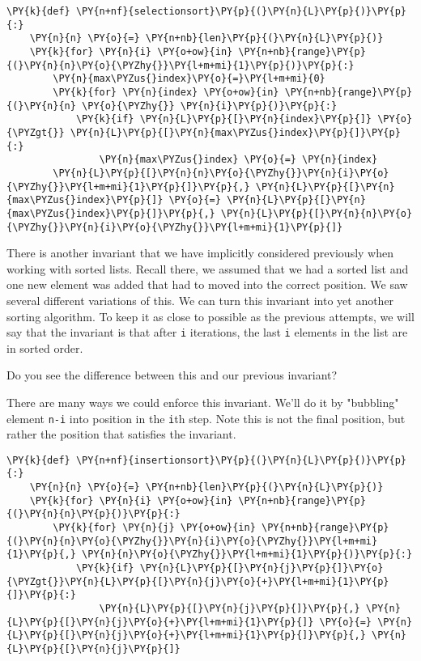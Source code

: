 \begin{Verbatim}[commandchars=\\\{\}]
\PY{k}{def} \PY{n+nf}{selectionsort}\PY{p}{(}\PY{n}{L}\PY{p}{)}\PY{p}{:}
    \PY{n}{n} \PY{o}{=} \PY{n+nb}{len}\PY{p}{(}\PY{n}{L}\PY{p}{)}
    \PY{k}{for} \PY{n}{i} \PY{o+ow}{in} \PY{n+nb}{range}\PY{p}{(}\PY{n}{n}\PY{o}{\PYZhy{}}\PY{l+m+mi}{1}\PY{p}{)}\PY{p}{:}
        \PY{n}{max\PYZus{}index}\PY{o}{=}\PY{l+m+mi}{0}        
        \PY{k}{for} \PY{n}{index} \PY{o+ow}{in} \PY{n+nb}{range}\PY{p}{(}\PY{n}{n} \PY{o}{\PYZhy{}} \PY{n}{i}\PY{p}{)}\PY{p}{:}
            \PY{k}{if} \PY{n}{L}\PY{p}{[}\PY{n}{index}\PY{p}{]} \PY{o}{\PYZgt{}} \PY{n}{L}\PY{p}{[}\PY{n}{max\PYZus{}index}\PY{p}{]}\PY{p}{:}
                \PY{n}{max\PYZus{}index} \PY{o}{=} \PY{n}{index}
        \PY{n}{L}\PY{p}{[}\PY{n}{n}\PY{o}{\PYZhy{}}\PY{n}{i}\PY{o}{\PYZhy{}}\PY{l+m+mi}{1}\PY{p}{]}\PY{p}{,} \PY{n}{L}\PY{p}{[}\PY{n}{max\PYZus{}index}\PY{p}{]} \PY{o}{=} \PY{n}{L}\PY{p}{[}\PY{n}{max\PYZus{}index}\PY{p}{]}\PY{p}{,} \PY{n}{L}\PY{p}{[}\PY{n}{n}\PY{o}{\PYZhy{}}\PY{n}{i}\PY{o}{\PYZhy{}}\PY{l+m+mi}{1}\PY{p}{]}
\end{Verbatim}



There is another invariant that we have implicitly considered previously when working with sorted lists.  Recall there, we assumed that we had a sorted list and one new element was added that had to moved into the correct position.  We saw several different variations of this.  We can turn this invariant into yet another sorting algorithm.  To keep it as close to possible as the previous attempts, we will say that the invariant is that after \texttt{i} iterations, the last \texttt{i} elements in the list are in sorted order.  


Do you see the difference between this and our previous invariant?


There are many ways we could enforce this invariant.  We'll do it by "bubbling" element \texttt{n-i} into position in the \texttt{i}th step.  Note this is not the final position, but rather the position that satisfies the invariant.

\begin{Verbatim}[commandchars=\\\{\}]
\PY{k}{def} \PY{n+nf}{insertionsort}\PY{p}{(}\PY{n}{L}\PY{p}{)}\PY{p}{:}
    \PY{n}{n} \PY{o}{=} \PY{n+nb}{len}\PY{p}{(}\PY{n}{L}\PY{p}{)}
    \PY{k}{for} \PY{n}{i} \PY{o+ow}{in} \PY{n+nb}{range}\PY{p}{(}\PY{n}{n}\PY{p}{)}\PY{p}{:}
        \PY{k}{for} \PY{n}{j} \PY{o+ow}{in} \PY{n+nb}{range}\PY{p}{(}\PY{n}{n}\PY{o}{\PYZhy{}}\PY{n}{i}\PY{o}{\PYZhy{}}\PY{l+m+mi}{1}\PY{p}{,} \PY{n}{n}\PY{o}{\PYZhy{}}\PY{l+m+mi}{1}\PY{p}{)}\PY{p}{:}
            \PY{k}{if} \PY{n}{L}\PY{p}{[}\PY{n}{j}\PY{p}{]}\PY{o}{\PYZgt{}}\PY{n}{L}\PY{p}{[}\PY{n}{j}\PY{o}{+}\PY{l+m+mi}{1}\PY{p}{]}\PY{p}{:}
                \PY{n}{L}\PY{p}{[}\PY{n}{j}\PY{p}{]}\PY{p}{,} \PY{n}{L}\PY{p}{[}\PY{n}{j}\PY{o}{+}\PY{l+m+mi}{1}\PY{p}{]} \PY{o}{=} \PY{n}{L}\PY{p}{[}\PY{n}{j}\PY{o}{+}\PY{l+m+mi}{1}\PY{p}{]}\PY{p}{,} \PY{n}{L}\PY{p}{[}\PY{n}{j}\PY{p}{]}
\end{Verbatim}



